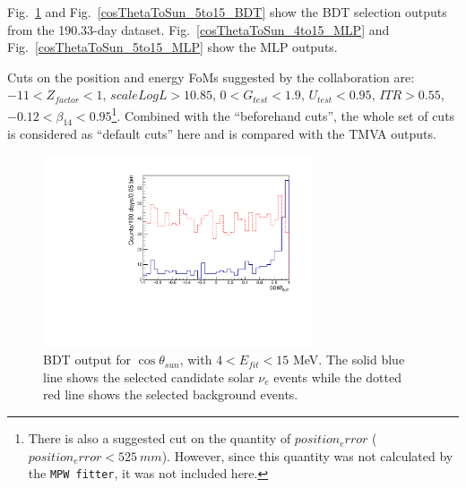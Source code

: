 Fig.~\ref{cosThetaToSun_4to15_BDT} and Fig.~\ref{cosThetaToSun_5to15_BDT} show the BDT selection outputs from the 190.33-day dataset. Fig.~\ref{cosThetaToSun_4to15_MLP} and Fig.~\ref{cosThetaToSun_5to15_MLP} show the MLP outputs. 


Cuts on the position and energy FoMs suggested by the collaboration\cite{morganFOM} are: $-11<Z_{factor}<1$, $scaleLogL>10.85$, $0<G_{test}<1.9$, $U_{test}<0.95$, $ITR>0.55$, $-0.12<\beta_{14}<0.95$\footnote{There is also a suggested cut on the quantity of $position_error$ ($position_error<525~mm$). However, since this quantity was not calculated by the \texttt{MPW fitter}, it was not included here.}. Combined with the ``beforehand cuts'', the whole set of cuts is considered as ``default cuts'' here and is compared with the TMVA outputs.

%

\begin{figure}[!htb]
	\centering
	\includegraphics[width=8cm]{cosThetaToSun_4to15_BDT.pdf}
	\caption[BDT output for $\cos\theta_{sun}$, with $4<E_{fit}<15$ MeV.]{BDT output for $\cos\theta_{sun}$, with $4<E_{fit}<15$ MeV. The solid blue line shows the selected candidate solar $\nu_e$ events while the dotted red line shows the selected background events.}
	\label{cosThetaToSun_4to15_BDT}
\end{figure}

